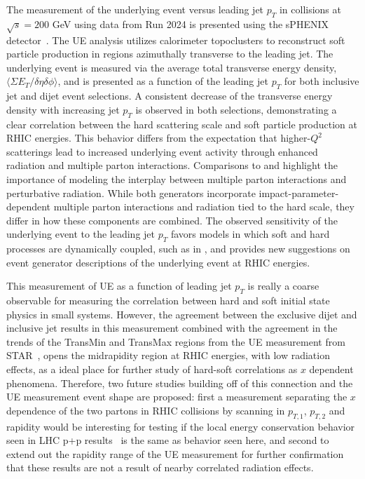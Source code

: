 The measurement of the underlying event versus leading jet $p_{T}$ in \pp collisions at $\sqrt{s}=200$ GeV using data from Run 2024 is presented using the sPHENIX detector~\cite{ppg10AN}. 
The UE analysis utilizes calorimeter topoclusters to reconstruct soft particle production in regions azimuthally transverse to the leading jet.
The underlying event is measured via the average total transverse energy density, $\langle\Sigma E_{T}/\delta\eta\delta\phi\rangle$, and is presented  as a function of the leading jet $p_{T}$ for both inclusive jet and dijet event selections. 
A consistent decrease of the transverse energy density with increasing jet $p_{T}$ is observed in both selections, demonstrating a clear correlation between the hard scattering scale and soft particle production at RHIC energies. This behavior differs from the expectation that higher-$Q^{2}$ scatterings lead to increased underlying event activity through enhanced radiation and multiple parton interactions.
Comparisons to \pythia and \herwig highlight the importance of modeling the interplay between multiple parton interactions and perturbative radiation. While both generators incorporate impact-parameter-dependent multiple parton interactions and radiation tied to the hard scale, they differ in how these components are combined. The observed sensitivity of the underlying event to the leading jet $p_{T}$ favors models in which soft and hard processes are dynamically coupled, such as in \pythia, and provides new suggestions on event generator descriptions of the underlying event at RHIC energies.

This measurement of UE as a function of leading jet $p_{T}$ is really a coarse observable for measuring the correlation between hard and soft initial state physics in small systems. However, the agreement between the exclusive dijet and inclusive jet results in this measurement combined with the agreement in the trends of the TransMin and TransMax regions from the UE measurement from STAR~\cite{STAR:2024underlying_event_pp_200gev}, opens the midrapidity region at RHIC energies, with low radiation effects, as a ideal place for further study of hard-soft correlations as $x$ dependent phenomena. Therefore, two future studies building off of this connection and the UE measurement event shape are proposed: first a measurement separating the $x$ dependence of the two partons in RHIC collisions by scanning in $p_{T,1}$, $p_{T,2}$ and rapidity would be interesting for testing if the local energy conservation behavior seen in LHC p+p results~\cite{ATLAS:2016transverse_energy_pp_276tev} is the same as behavior seen here, and second to extend out the rapidity range of the UE measurement for further confirmation that these results are not a result of nearby correlated radiation effects.
